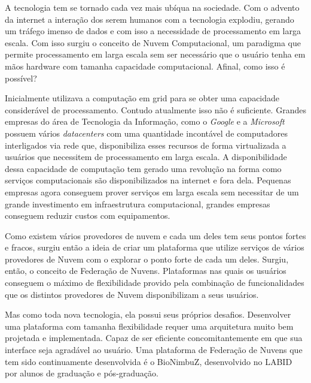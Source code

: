 A tecnologia tem se tornado cada vez mais ubíqua na sociedade. Com o advento da internet a interação dos serem humanos com a tecnologia explodiu, gerando um tráfego imenso de dados e com isso a necessidade de processamento em larga escala. Com isso surgiu o conceito de Nuvem Computacional, um paradigma que permite processamento em larga escala sem ser necessário que o usuário tenha em mãos hardware com tamanha capacidade computacional. Afinal, como isso é possível?

Inicialmente utilizava a computação em grid para se obter uma capacidade considerável de processamento. Contudo atualmente isso não é suficiente. Grandes empresas do área de Tecnologia da Informação, como o \textit{Google} e a \textit{Microsoft} possuem vários \textit{datacenters} com uma quantidade incontável de computadores interligados via rede que, disponibiliza esses recursos de forma virtualizada a usuários que necessitem de processamento em larga escala. A disponibilidade dessa capacidade de computação tem gerado uma revolução na forma como serviços computacionais são disponibilizados na internet e fora dela.
Pequenas empresas agora conseguem prover serviços em larga escala sem necessitar de um grande investimento em infraestrutura computacional, grandes empresas conseguem reduzir custos com equipamentos.

Como existem vários provedores de nuvem e cada um deles tem seus pontos fortes e fracos, surgiu então a ideia de criar um plataforma que utilize serviços de vários provedores de Nuvem com o explorar o ponto forte de cada um deles. Surgiu, então, o conceito de Federação de Nuvens. Plataformas nas quais os usuários conseguem o máximo de flexibilidade provido pela combinação de funcionalidades que os distintos provedores de Nuvem disponibilizam a seus usuários.

Mas como toda nova tecnologia, ela possui seus próprios desafios. Desenvolver uma plataforma com tamanha flexibilidade requer uma arquitetura muito bem projetada e implementada. Capaz de ser eficiente concomitantemente em que sua interface seja agradável ao usuário. Uma plataforma de Federação de Nuvens que tem sido continuamente desenvolvida é o BioNimbuZ, desenvolvido no \acrfull{LABID} por alunos de graduação e pós-graduação. \cite{BioNimbuZ_Breno_Deric} \cite{BioNimbuZ_Closer} \cite{BioNimbuZ_6846526} \cite{Saldanha2012} \cite{6732620_BioNimbuZ_ACOsched} \cite{BioNimbuZ_Willian_C99} \cite{closer12_BioNimbuZ_AHP} \cite{Saldanha_BioNimbus}








